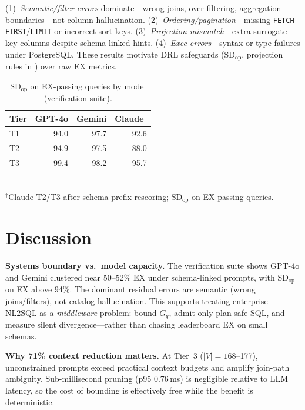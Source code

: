 \documentclass[twocolumn]{svjour3}
\begin{document}
(1)~\emph{Semantic/filter errors} dominate---wrong joins, over-filtering, aggregation boundaries---not column hallucination.
(2)~\emph{Ordering/pagination}---missing \texttt{FETCH FIRST}/\texttt{LIMIT} or incorrect sort keys.
(3)~\emph{Projection mismatch}---extra surrogate-key columns despite schema-linked hints.
(4)~\emph{Exec errors}---syntax or type failures under PostgreSQL.
These results motivate DRL safeguards ($\text{SD}_{\text{op}}$, projection rules in ) over raw EX metrics.

\begin{table}[t]
\centering
\caption{$\text{SD}_{\text{op}}$ on EX-passing queries by model (verification suite).}
\label{tab:sdop}
\small
\begin{tabular}{@{}lrrr@{}}
\toprule
\textbf{Tier} & \textbf{GPT-4o} & \textbf{Gemini} & \textbf{Claude}$^\dagger$ \\
\midrule
T1 & 94.0 & 97.7 & 92.6 \\
T2 & 94.9 & 97.5 & 88.0 \\
T3 & 99.4 & 98.2 & 95.7 \\
\bottomrule
\end{tabular}\\
{\scriptsize $^\dagger$Claude T2/T3 after schema-prefix rescoring; SD$_{\text{op}}$ on EX-passing queries.}
\end{table}

\section{Discussion}
\label{sec:discussion}

\textbf{Systems boundary vs.\ model capacity.}
The verification suite shows GPT-4o and Gemini clustered near 50--52\% EX under schema-linked prompts, with $\text{SD}_{\text{op}}$ on EX above 94\%.
The dominant residual errors are semantic (wrong joins/filters), not catalog hallucination.
This supports treating enterprise NL2SQL as a \emph{middleware} problem: bound $G_q$, admit only plan-safe SQL, and measure silent divergence---rather than chasing leaderboard EX on small schemas.

\textbf{Why 71\% context reduction matters.}
At Tier~3 ($|V|{=}168$--177), unconstrained prompts exceed practical context budgets and amplify join-path ambiguity.
Sub-millisecond pruning (p95 0.76\,ms) is negligible relative to LLM latency, so the cost of bounding is effectively free while the benefit is deterministic.
\end{document}
